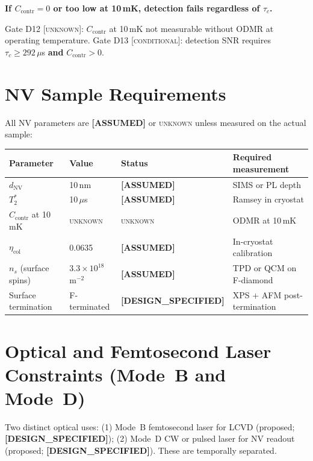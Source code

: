 \documentclass[12pt,a4paper]{article}
\newcommand{\conditional}{\textsc{conditional}}
\newcommand{\unknown}{\textsc{unknown}}
\newcommand{\assumed}{\textbf{[ASSUMED]}}
\newcommand{\designspec}{\textbf{[DESIGN\_SPECIFIED]}}
\begin{document}
\textbf{If $C_\mathrm{contr} = 0$ or too low at 10\,mK, detection fails
regardless of $\tau_c$.}

Gate D12 [\unknown{}]: $C_\mathrm{contr}$ at 10\,mK not measurable without
ODMR at operating temperature.
Gate D13 [\conditional{}]: detection SNR requires $\tau_c \geq 292\,\mu$s \textbf{and}
$C_\mathrm{contr} > 0$.

\section{NV Sample Requirements}
\label{sec:nv}

All NV parameters are \assumed{} or \unknown{} unless measured on the actual sample:

\begin{center}
\small
\begin{tabular}{llll}
\toprule
Parameter & Value & Status & Required measurement \\
\midrule
$d_\mathrm{NV}$ & 10\,nm & \assumed{} & SIMS or PL depth \\
$T_2^*$ & 10\,$\mu$s & \assumed{} & Ramsey in cryostat \\
$C_\mathrm{contr}$ at 10\,mK & \unknown{} & \unknown{} & ODMR at 10\,mK \\
$\eta_\mathrm{col}$ & 0.0635 & \assumed{} & In-cryostat calibration \\
$n_s$ (surface spins) & $3.3\times10^{18}$\,m$^{-2}$ & \assumed{} & TPD or QCM on F-diamond \\
Surface termination & F-terminated & \designspec{} & XPS + AFM post-termination \\
\bottomrule
\end{tabular}
\end{center}

\section{Optical and Femtosecond Laser Constraints (Mode~B and Mode~D)}
\label{sec:optical}

Two distinct optical uses:
(1) Mode~B femtosecond laser for LCVD (proposed; \designspec{});
(2) Mode~D CW or pulsed laser for NV readout (proposed; \designspec{}).
These are temporally separated.
\end{document}
